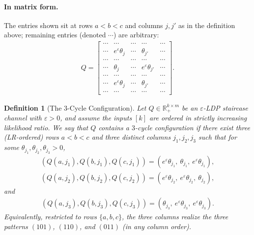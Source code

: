 \documentclass{article}
\theoremstyle{plain}
\newtheorem{definition}[theorem]{Definition}
\theoremstyle{definition}
\theoremstyle{plain}
\begin{document}
\paragraph{In matrix form.}
The entries shown sit at rows $a<b<c$ and columns $j,j'$ as in the definition above; remaining entries (denoted $\cdots$) are arbitrary:
\begin{align*}
    Q=
    \begin{bmatrix}
    \cdots & \cdots & \cdots & \cdots & \cdots \\
    \cdots & e^\varepsilon \theta_j & \cdots & \theta_{j'} & \cdots \\
    \cdots & \cdots & \cdots & \cdots & \cdots \\
    \cdots & \theta_j & \cdots & e^\varepsilon \theta_{j'} & \cdots \\
    \cdots & \cdots & \cdots & \cdots & \cdots \\
    \cdots & e^\varepsilon \theta_j & \cdots & \theta_{j'} & \cdots \\
    \cdots & \cdots & \cdots & \cdots & \cdots
    \end{bmatrix}.
\end{align*}
\begin{definition}[The $3$-Cycle Configuration]
Let $Q\in\mathbb{R}_+^{k\times m}$ be an $\varepsilon$-LDP \emph{staircase} channel with $\varepsilon>0$, and assume the inputs $[k]$ are ordered in strictly increasing likelihood ratio. We say that $Q$ \emph{contains a $3$-cycle configuration} if there exist three (LR-ordered) rows $a<b<c$ and three distinct columns $j_1,j_2,j_3$ such that for some $\theta_{j_1},\theta_{j_2},\theta_{j_3}>0$,
\begin{align*}
    (Q(a,j_1),Q(b,j_1),Q(c,j_1))=(e^\varepsilon\theta_{j_1},\ \theta_{j_1},\ e^\varepsilon\theta_{j_1}),
\end{align*}
\begin{align*}
    (Q(a,j_2),Q(b,j_2),Q(c,j_2))=(e^\varepsilon\theta_{j_2},\ e^\varepsilon\theta_{j_2},\ \theta_{j_2}),
\end{align*}
and
\begin{align*}
    (Q(a,j_3),Q(b,j_3),Q(c,j_3))=(\theta_{j_3},\ e^\varepsilon\theta_{j_3},\ e^\varepsilon\theta_{j_3}).
\end{align*}
Equivalently, restricted to rows $\{a,b,c\}$, the three columns realize the three patterns $(101)$, $(110)$, and $(011)$ (in any column order).
\end{definition}
\end{document}
